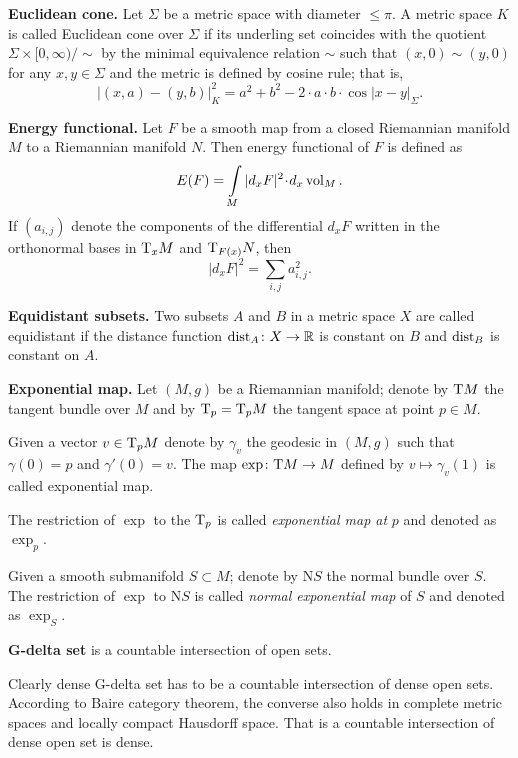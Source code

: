 \begin{description}
\item{\bf Euclidean cone.}\label{Euclidean cone} 
Let $\Sigma$ be a metric space with diameter $\le \pi$. 
A metric space $K$ is called Euclidean cone over $\Sigma$
if its underling set 
coincides with the quotient 
$\Sigma\times [0,\infty)/{\sim}$
by the minimal equivalence relation $\sim$ such that $(x,0)\sim(y,0)$ for any $x,y\in \Sigma$
and the metric is defined by cosine rule;
that is,
$$|(x,a)-(y,b)|^2_K=a^2+b^2-2\cdot a\cdot b\cdot\!\cos|x-y|_\Sigma.$$

\item{\bf Energy functional.}\label{Energy functional} Let $F$ be a smooth map from a closed Riemannian manifold $M$ to a Riemannian manifold $N$.
Then energy functional of $F$ is defined as
\[E(F)=\int\limits_M |d_xF|^2\cdot d_x\vol_M.\]
If $(a_{i,j})$ denote the components 
of the differential $d_xF$ 
written in the orthonormal bases in $\mathrm{T}_xM$ and $\mathrm{T}_{F(x)}N$,
then 
\[|d_xF|^2=\sum_{i,j}a_{i,j}^2.\]

\item{\bf Equidistant subsets.}\label{Equidistant subsets} 
Two subsets $A$ and $B$ in a metric space $X$ are called equidistant if the distance function $\operatorname{\rm dist}_A\colon X\to\mathbb{R}$ is constant on $B$ and $\operatorname{\rm dist}_B$ is constant on $A$.

\item{\bf Exponential map.}\label{Exponential map} 
Let $(M,g)$ be a Riemannian manifold;
denote by $\mathrm{T} M$ the tangent bundle over $M$ and by $\mathrm{T}_p=\mathrm{T}_pM$ the tangent space at point $p\in M$.

Given a vector $v\in\mathrm{T}_pM$ denote by $\gamma_v$ the geodesic in $(M,g)$
such that $\gamma(0)=p$ and $\gamma'(0)=v$.
The map $\exp\colon\mathrm{T} M\to M$ defined by $v\mapsto \gamma_v(1)$ is called exponential map.

The restriction of $\exp$ to the $\mathrm{T}_p$ is called \emph{exponential map at} $p$ and denoted as $\exp_p$.

Given a smooth submanifold $S\subset M$;
denote by $\mathrm{N} S$ the normal bundle over $S$.
The restriction of $\exp$ to $\mathrm{N} S$ is called \emph{normal exponential map} of $S$ and denoted as $\exp_S$. 

\item{\bf G-delta set}\label{G-delta set} is a countable intersection of open sets.

Clearly dense G-delta set has to be a countable intersection of dense open sets.
According to Baire category theorem, the converse also holds in complete metric spaces and  locally compact Hausdorff space.
That is a countable intersection of dense open set is dense.


\end{description}
